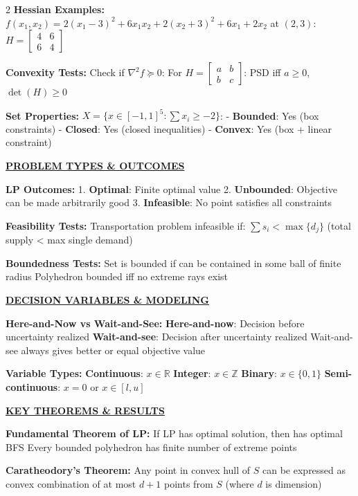 \documentclass[8pt,a4paper,landscape]{article}
\newcommand{\mysection}[1]{\textbf{\underline{#1}}}
\newcommand{\mysubsection}[1]{\textbf{#1:}}
\begin{document}
\begin{multicols}{2}
\mysubsection{Hessian Examples}
$f(x_1,x_2) = 2(x_1-3)^2 + 6x_1x_2 + 2(x_2+3)^2 + 6x_1 + 2x_2$ at $(2,3)$:
$H = \begin{bmatrix} 4 & 6 \\ 6 & 4 \end{bmatrix}$

\mysubsection{Convexity Tests}
Check if $\nabla^2 f \succeq 0$:
For $H = \begin{bmatrix} a & b \\ b & c \end{bmatrix}$: PSD iff $a \geq 0$, $\det(H) \geq 0$

\mysubsection{Set Properties}
$X = \{x \in [-1,1]^5 : \sum x_i \geq -2\}$:
- \textbf{Bounded}: Yes (box constraints)
- \textbf{Closed}: Yes (closed inequalities)
- \textbf{Convex}: Yes (box + linear constraint)

\mysection{PROBLEM TYPES \& OUTCOMES}

\mysubsection{LP Outcomes}
1. \textbf{Optimal}: Finite optimal value
2. \textbf{Unbounded}: Objective can be made arbitrarily good
3. \textbf{Infeasible}: No point satisfies all constraints

\mysubsection{Feasibility Tests}
Transportation problem infeasible if:
$\sum s_i < \max\{d_j\}$ (total supply < max single demand)

\mysubsection{Boundedness Tests}
Set is bounded if can be contained in some ball of finite radius
Polyhedron bounded iff no extreme rays exist

\mysection{DECISION VARIABLES \& MODELING}

\mysubsection{Here-and-Now vs Wait-and-See}
\textbf{Here-and-now}: Decision before uncertainty realized
\textbf{Wait-and-see}: Decision after uncertainty realized
Wait-and-see always gives better or equal objective value

\mysubsection{Variable Types}
\textbf{Continuous}: $x \in \mathbb{R}$
\textbf{Integer}: $x \in \mathbb{Z}$
\textbf{Binary}: $x \in \{0,1\}$
\textbf{Semi-continuous}: $x = 0$ or $x \in [l,u]$

\mysection{KEY THEOREMS \& RESULTS}

\mysubsection{Fundamental Theorem of LP}
If LP has optimal solution, then has optimal BFS
Every bounded polyhedron has finite number of extreme points

\mysubsection{Caratheodory's Theorem}
Any point in convex hull of $S$ can be expressed as convex combination of at most $d+1$ points from $S$ (where $d$ is dimension)


\end{multicols}
\end{document}
